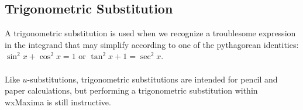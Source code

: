 \documentclass[10.5pt,twoside]{report}
\theoremstyle{definition}
\begin{document}
\subsection{Trigonometric Substitution}

A trigonometric substitution is used when we recognize a troublesome expression in the integrand that may simplify according to one of the pythagorean identities:  $\sin^2{x}+\cos^2{x}=1$ or $\tan^2{x}+1=\sec^2{x}$.\\

${}$\\

Like $u$-substitutions, trigonometric substitutions are intended for pencil and paper calculations, but performing a trigonometric substitution within wxMaxima is still instructive.
${}$\\
${}$\\
\end{document}
